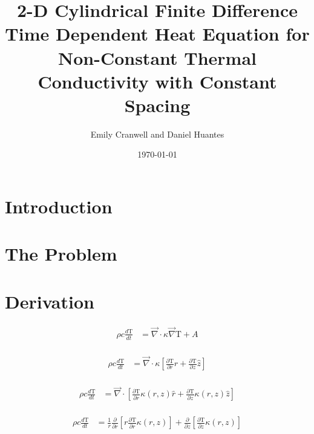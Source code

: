 \documentclass[12pt]{article}
\begin{document}
	\small
	\title{2-D Cylindrical Finite Difference Time Dependent Heat Equation for Non-Constant Thermal Conductivity with Constant Spacing}  
	\normalsize
	\author{Emily Cranwell and Daniel Huantes}
	\date{\today} 
	\maketitle
		\section{Introduction}
		
		\section{The Problem}
		
		\section{Derivation}
		
		\begin{equation}
		\begin{aligned}
		\rho c \frac{d\mathrm{T}}{dt} &= \vec\nabla \cdot \kappa \vec\nabla \mathrm{T} + A \\
		\end{aligned}
		\end{equation}
		
		\begin{equation}
		\begin{aligned}
		\rho c \frac{d\mathrm{T}}{dt} &= \vec\nabla \cdot \kappa \left [  \frac{\partial\mathrm{T}}{\partial r}\hat r  + \frac{\partial\mathrm{T}}{\partial z}\hat z \right ] \\
		\end{aligned}
		\end{equation}
		
		\begin{equation}
		\begin{aligned}
		\rho c \frac{d\mathrm{T}}{dt} &= \vec\nabla \cdot \left [  \frac{\partial\mathrm{T}}{\partial r}\kappa(r, z) \hat r  + \frac{\partial\mathrm{T}}{\partial z}\kappa(r, z) \hat z \right ] \\
		\end{aligned}
		\end{equation}
		
		\begin{equation}
		\begin{aligned}
		\rho c \frac{d\mathrm{T}}{dt} &= \frac{1}{r}\frac{\partial}{\partial r}  \left [ r \frac{\partial\mathrm{T}}{\partial r}\kappa(r, z) \right ]  + \frac{\partial}{\partial z} \left [ \frac{\partial\mathrm{T}}{\partial z}\kappa(r, z)  \right ] \\
		\end{aligned}
		\end{equation}
		
\end{document}
